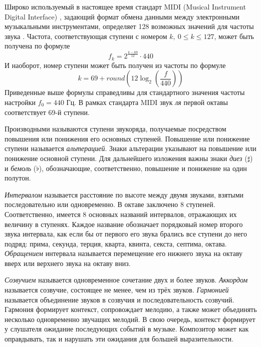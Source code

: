 Широко используемый в настоящее время стандарт MIDI (Musical Instrument
Digital Interface) \cite{MIDI}, задающий формат обмена данными между
электронными музыкальными инструментами, определяет 128 возможных значений для
частоты звука \cite{MIDITuning}. Частота, соответствующая ступени с номером
$k,~0 \leq k \leq 127$, может быть получена по формуле $$f_k = 2^{\frac{k -
69}{12}} \cdot 440$$ И наоборот, номер ступени может быть получен из частоты по
формуле
\begin{equation}
\label{eq:fton}
k = 69 + round \left( 12 \log_2 \left( \frac{f}{440} \right) \right)
\end{equation}
Приведенные выше формулы справедливы для стандартного значения частоты
настройки $f_0 = 440$ Гц. В рамках стандарта MIDI звук \emph{ля} первой октавы
соответствует 69-й ступени.

Производными называются ступени звукоряда, получаемые посредством повышения или
понижения его основных ступеней. Повышение или понижение ступени называется
\emph{альтерацией}. Знаки альтерации указывают на повышение или понижение
основной ступени. Для дальнейшего изложения важны знаки \emph{диез} ($\sharp$) и
\emph{бемоль} ($\flat$), обозначающие, соответственно, повышение и понижение на
один полутон.

\emph{Интервалом} называется расстояние по высоте между двумя звуками, взятыми
последовательно или одновременно. В октаве заключено 8 ступеней. Соответственно,
имеется 8 основных названий интервалов, отражающих их величину в ступенях.
Каждое название обозначает порядковый номер второго звука интервала, как если бы
от первого его звука брались все ступени до него подряд: прима, секунда, терция,
кварта, квинта, секста, септима, октава. \emph{Обращением} интервала называется
перемещение его нижнего звука на октаву вверх или верхнего звука на октаву вниз.

\emph{Созвучием} называется одновременное сочетание двух и более звуков.
\emph{Аккордом} называется созвучие, состоящее не менее, чем из трёх звуков.
\emph{Гармонией} называется объединение звуков в созвучия и последовательность
созвучий. Гармония формирует контекст, сопровождает мелодию, а также может
объединять несколько одновременно звучащих мелодий. В свою очередь, контекст
формирует у слушателя ожидание последующих событий в музыке. Композитор может
как оправдывать, так и нарушать эти ожидания для большей выразительности.

